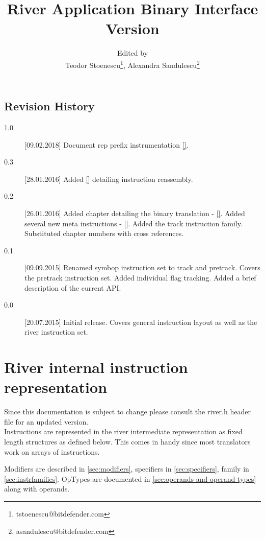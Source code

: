 \documentclass[12pt]{report}
\begin{document}
\author{Edited by\\
  Teodor Stoenescu\thanks{tstoenescu@bitdefender.com},
  Alexandra Sandulescu\thanks{asandulescu@bitdefender.com}}

\title{River Application Binary Interface\\
Version \version}
\maketitle
\tableofcontents

\section*{Revision History}

\begin{description}
	\item[1.0][09.02.2018] Document rep prefix instrumentation \autoref{}.
\item[0.3][28.01.2016] Added \autoref{} detailing instruction reassembly.
\item[0.2][26.01.2016] Added chapter detailing the binary translation - \autoref{}.
Added several new meta instructions - \autoref{}.
Added the track instruction family.
Substituted chapter numbers with cross references.
\item[0.1][09.09.2015] Renamed symbop instruction set to track and pretrack.
Covers the pretrack instruction set.
Added individual flag tracking.
Added a brief description of the current API.
\item[0.0][20.07.2015] Initial release. Covers general instruction layout as well as the river instruction set.
\end{description}

\chapter{River internal instruction representation}
Since this documentation is subject to change please consult the river.h header file for an updated version.\\
Instructions are represented in the river intermediate representation as fixed length structures as defined below. This comes in handy since most translators work on arrays of instructions.



Modifiers are described in \autoref{sec:modifiers}, specifiers in \autoref{sec:specifiers}, family in \autoref{sec:instrfamilies}. OpTypes are documented in \autoref{sec:operands-and-operand-types} along with operands.
\end{document}

